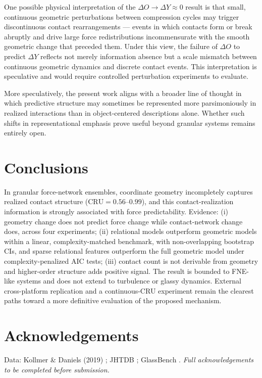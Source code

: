 \documentclass[11pt,a4paper]{article}
\begin{document}
One possible physical interpretation of the $\Delta O\!\rightarrow\!\Delta Y \approx 0$ result is that small, continuous geometric perturbations between compression cycles may trigger discontinuous contact rearrangements --- events in which contacts form or break abruptly and drive large force redistributions incommensurate with the smooth geometric change that preceded them. Under this view, the failure of $\Delta O$ to predict $\Delta Y$ reflects not merely information absence but a scale mismatch between continuous geometric dynamics and discrete contact events. This interpretation is speculative and would require controlled perturbation experiments to evaluate.

More speculatively, the present work aligns with a broader line of thought in which predictive structure may sometimes be represented more parsimoniously in realized interactions than in object-centered descriptions alone.
Whether such shifts in representational emphasis prove useful beyond granular systems remains entirely open.

\section{Conclusions}

In granular force-network ensembles, coordinate geometry incompletely captures realized contact structure ($\mathrm{CRU} = 0.56$--$0.99$), and this contact-realization information is strongly associated with force predictability.
Evidence: (i) geometry change does not predict force change while contact-network change does, across four experiments; (ii) relational models outperform geometric models within a linear, complexity-matched benchmark, with non-overlapping bootstrap CIs, and sparse relational features outperform the full geometric model under complexity-penalized AIC tests; (iii) contact count is not derivable from geometry and higher-order structure adds positive signal.
The result is bounded to FNE-like systems and does not extend to turbulence or glassy dynamics.
External cross-platform replication and a continuous-CRU experiment remain the clearest paths toward a more definitive evaluation of the proposed mechanism.

\section*{Acknowledgements}
Data: Kollmer \& Daniels (2019) \cite{kollmer2019}; JHTDB \cite{li2008jhtdb}; GlassBench \cite{bapst2020}.
\textit{Full acknowledgements to be completed before submission.}
\end{document}
